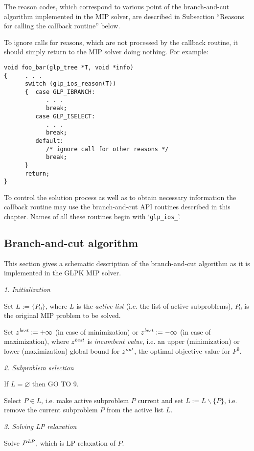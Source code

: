 The reason codes, which correspond to various point of the
branch-and-cut algorithm implemented in the MIP solver, are described
in Subsection ``Reasons for calling the callback routine'' below.

To ignore calls for reasons, which are not processed by the callback
routine, it should simply return to the MIP solver doing nothing. For
example:

\begin{verbatim}
void foo_bar(glp_tree *T, void *info)
{     . . .
      switch (glp_ios_reason(T))
      {  case GLP_IBRANCH:
            . . .
            break;
         case GLP_ISELECT:
            . . .
            break;
         default:
            /* ignore call for other reasons */
            break;
      }
      return;
}
\end{verbatim}

To control the solution process as well as to obtain necessary
information the callback routine may use the branch-and-cut API
routines described in this chapter. Names of all these routines begin
with `\verb|glp_ios_|'.

\subsection{Branch-and-cut algorithm}

This section gives a schematic description of the branch-and-cut
algorithm as it is implemented in the GLPK MIP solver.

{\it 1. Initialization}

Set $L:=\{P_0\}$, where $L$ is the {\it active list} (i.e. the list of
active subproblems), $P_0$ is the original MIP problem to be solved.

Set $z^{\it best}:=+\infty$ (in case of minimization) or
$z^{\it best}:=-\infty$ (in case of maximization), where $z^{\it best}$
is {\it incumbent value}, i.e. an upper (minimization) or lower
(maximization) global bound for $z^{\it opt}$, the optimal objective
value for $P^0$.

{\it 2. Subproblem selection}

If $L=\varnothing$ then GO TO 9.

Select $P\in L$, i.e. make active subproblem $P$ current and set
$L:=L\backslash\{P\}$, i.e. remove the current subproblem $P$ from the
active list $L$.


{\it 3. Solving LP relaxation}

Solve $P^{\it LP}$, which is LP relaxation of $P$.

